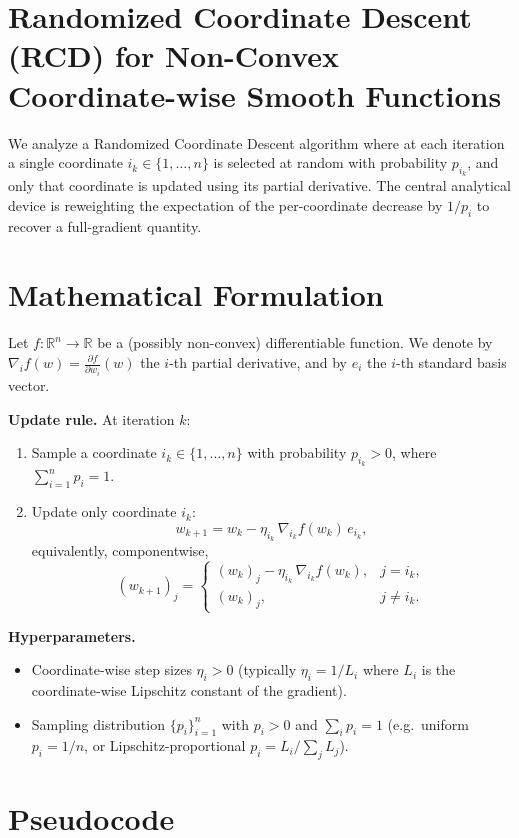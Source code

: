 \documentclass{article}
\begin{document}
\section*{Randomized Coordinate Descent (RCD) for Non-Convex Coordinate-wise Smooth Functions}

We analyze a Randomized Coordinate Descent algorithm where at each iteration a single
coordinate $i_k \in \{1, \dots, n\}$ is selected at random with probability $p_{i_k}$,
and only that coordinate is updated using its partial derivative. The central analytical
device is reweighting the expectation of the per-coordinate decrease by $1/p_i$ to
recover a full-gradient quantity.

\section*{Mathematical Formulation}

Let $f : \mathbb{R}^n \to \mathbb{R}$ be a (possibly non-convex) differentiable function.
We denote by $\nabla_i f(w) = \frac{\partial f}{\partial w_i}(w)$ the $i$-th partial
derivative, and by $e_i$ the $i$-th standard basis vector.

\textbf{Update rule.} At iteration $k$:
\begin{enumerate}
\item Sample a coordinate $i_k \in \{1,\dots,n\}$ with probability $p_{i_k} > 0$,
where $\sum_{i=1}^n p_i = 1$.
\item Update only coordinate $i_k$:
\[
w_{k+1} = w_k - \eta_{i_k}\, \nabla_{i_k} f(w_k)\, e_{i_k},
\]
equivalently, componentwise,
\[
(w_{k+1})_j =
\begin{cases}
(w_k)_j - \eta_{i_k}\,\nabla_{i_k} f(w_k), & j = i_k,\\[4pt]
(w_k)_j, & j \neq i_k.
\end{cases}
\]
\end{enumerate}

\textbf{Hyperparameters.}
\begin{itemize}
\item Coordinate-wise step sizes $\eta_i > 0$ (typically $\eta_i = 1/L_i$ where $L_i$
is the coordinate-wise Lipschitz constant of the gradient).
\item Sampling distribution $\{p_i\}_{i=1}^n$ with $p_i > 0$ and $\sum_i p_i = 1$
(e.g.\ uniform $p_i = 1/n$, or Lipschitz-proportional $p_i = L_i / \sum_j L_j$).
\end{itemize}

\section*{Pseudocode}
\end{document}
